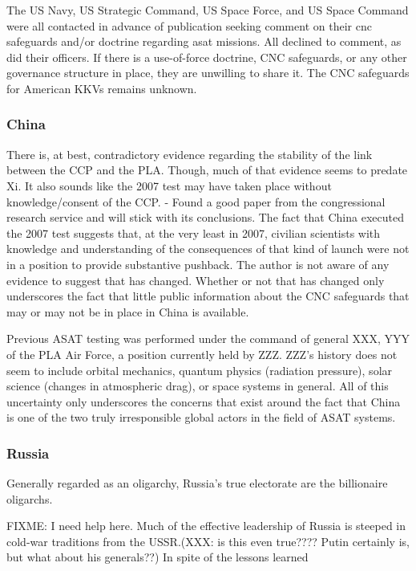 The US Navy, US Strategic Command, US Space Force, and US Space
Command were all contacted in advance of publication seeking comment
on their \ac{cnc} safeguards and/or doctrine regarding \ac{asat}
missions.  All declined to comment, as did their officers.  If there
is a use-of-force doctrine, CNC safeguards, or any other governance
structure in place, they are unwilling to share it. The CNC safeguards
for American KKVs remains unknown.

\subsubsection{China}

There is, at best, contradictory evidence regarding the stability of
the link between the CCP and the PLA.  Though, much of that evidence
seems to predate Xi.  It also sounds like the 2007 test may have taken
place without knowledge/consent of the CCP. - Found a good paper from
the congressional research service and will stick with its
conclusions.  The fact that China executed the 2007 test suggests
that, at the very least in 2007, civilian scientists with knowledge
and understanding of the consequences of that kind of launch were not
in a position to provide substantive pushback.  The author is not
aware of any evidence to suggest that has changed.  Whether or not
that has changed only underscores the fact that little public
information about the CNC safeguards that may or may not be in place
in China is available.

Previous ASAT testing was performed under the command of general XXX,
YYY of the PLA Air Force, a position currently held by ZZZ.  ZZZ's
history does not seem to include orbital mechanics, quantum physics
(radiation pressure), solar science (changes in atmospheric drag), or
space systems in general.  All of this uncertainty only underscores
the concerns that exist around the fact that China is one of the two
truly irresponsible global actors in the field of ASAT systems.

\subsubsection{Russia}

Generally regarded as an oligarchy, Russia's true electorate are the
billionaire oligarchs.

FIXME: I need help here.  Much of the effective leadership of Russia
is steeped in cold-war traditions from the USSR.(XXX: is this even
true????  Putin certainly is, but what about his generals??)  In spite
of the lessons learned

